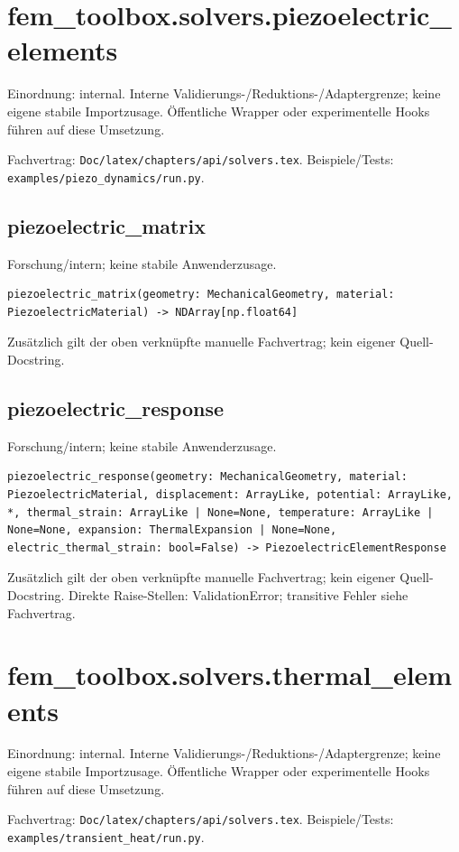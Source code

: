 \section{fem\_toolbox.solvers.piezoelectric\_elements}
Einordnung: internal. Interne Validierungs-/Reduktions-/Adaptergrenze; keine eigene stabile Importzusage. Öffentliche Wrapper oder experimentelle Hooks führen auf diese Umsetzung.
\par Fachvertrag: \nolinkurl{Doc/latex/chapters/api/solvers.tex}. Beispiele/Tests:
\nolinkurl{examples/piezo_dynamics/run.py}.
\subsection{piezoelectric\_matrix}
Forschung/intern; keine stabile Anwenderzusage.
\begin{lstlisting}
piezoelectric_matrix(geometry: MechanicalGeometry, material: PiezoelectricMaterial) -> NDArray[np.float64]
\end{lstlisting}
Zusätzlich gilt der oben verknüpfte manuelle Fachvertrag; kein eigener Quell-Docstring.
\subsection{piezoelectric\_response}
Forschung/intern; keine stabile Anwenderzusage.
\begin{lstlisting}
piezoelectric_response(geometry: MechanicalGeometry, material: PiezoelectricMaterial, displacement: ArrayLike, potential: ArrayLike, *, thermal_strain: ArrayLike | None=None, temperature: ArrayLike | None=None, expansion: ThermalExpansion | None=None, electric_thermal_strain: bool=False) -> PiezoelectricElementResponse
\end{lstlisting}
Zusätzlich gilt der oben verknüpfte manuelle Fachvertrag; kein eigener Quell-Docstring.
Direkte Raise-Stellen: ValidationError; transitive Fehler siehe Fachvertrag.
\section{fem\_toolbox.solvers.thermal\_elements}
Einordnung: internal. Interne Validierungs-/Reduktions-/Adaptergrenze; keine eigene stabile Importzusage. Öffentliche Wrapper oder experimentelle Hooks führen auf diese Umsetzung.
\par Fachvertrag: \nolinkurl{Doc/latex/chapters/api/solvers.tex}. Beispiele/Tests:
\nolinkurl{examples/transient_heat/run.py}.
